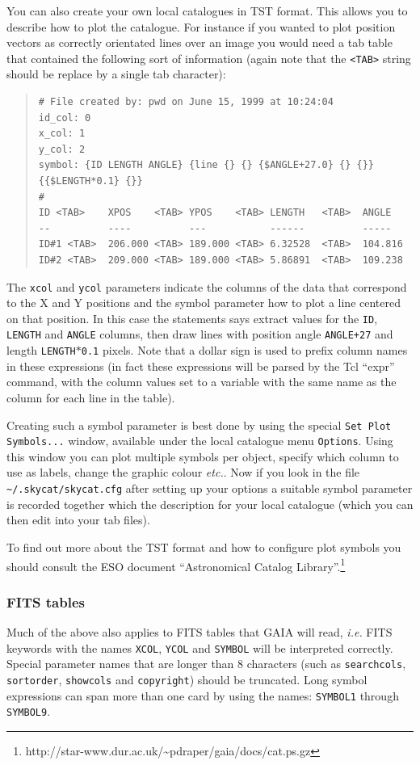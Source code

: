 \documentclass[twoside,11pt]{article}
\newcommand{\htmladdnormallinkfoot}[2]{#1\footnote{#2}}
\renewcommand{\_}{\texttt{\symbol{95}}}
\newcommand{\mytt}[1]{{\texttt{#1}}}
\begin{document}
You can also create your own local catalogues in TST format. This
allows you to describe how to plot the catalogue. For instance if you
wanted to plot position vectors as correctly orientated lines over an
image you would need a tab table that contained the following sort of
information (again note that the \mytt{<TAB>} string should be replace
by a single tab character):
\begin{quote}
\begin{verbatim}
# File created by: pwd on June 15, 1999 at 10:24:04
id_col: 0
x_col: 1
y_col: 2
symbol: {ID LENGTH ANGLE} {line {} {} {$ANGLE+27.0} {} {}} {{$LENGTH*0.1} {}}
#
ID <TAB>    XPOS    <TAB> YPOS    <TAB> LENGTH   <TAB>  ANGLE
--          ----          ---           ------          -----
ID#1 <TAB>  206.000 <TAB> 189.000 <TAB> 6.32528  <TAB>  104.816
ID#2 <TAB>  209.000 <TAB> 189.000 <TAB> 5.86891  <TAB>  109.238
\end{verbatim}
\end{quote}
The \mytt{x\_col} and \mytt{y\_col} parameters indicate the columns of
the data that correspond to the X and Y positions and the symbol
parameter how to plot a line centered on that position. In this case
the statements says extract values for the \mytt{ID}, \mytt{LENGTH}
and \mytt{ANGLE} columns, then draw lines with position angle
\mytt{ANGLE+27} and length \mytt{LENGTH$*$0.1} pixels. Note that a
dollar sign is used to prefix column names in these expressions (in
fact these expressions will be parsed by the Tcl ``expr'' command,
with the column values set to a variable with the same name as the
column for each line in the table).

Creating such a symbol parameter is best done by using the special
\mytt{Set Plot Symbols...} window, available under the local catalogue
menu \mytt{Options}. Using this window you can plot multiple symbols per
object, specify which column to use as labels, change the graphic
colour {\em etc.}. Now if you look in the file
\mytt{\~{}/.skycat/skycat.cfg} after setting up your options a suitable
symbol parameter is recorded together which the description for your
local catalogue (which you can then edit into your tab files).

To find out more about the TST format and how to configure plot
symbols you should consult the ESO document
\htmladdnormallinkfoot{``Astronomical Catalog Library''.}
{http://star-www.dur.ac.uk/\~{}pdraper/gaia/docs/cat.ps.gz}

\subsubsection{FITS tables} Much of the above also applies to FITS tables
that GAIA will read, \textit{i.e.} FITS keywords with the names
\mytt{X\_COL}, \mytt{Y\_COL} and \mytt{SYMBOL} will be interpreted
correctly. Special parameter names that are longer than 8 characters
(such as \mytt{search\_cols}, \mytt{sort\_order}, \mytt{show\_cols}
and \mytt{copyright}) should be truncated. Long symbol expressions can
span more than one card by using the names: \mytt{SYMBOL1} through
\mytt{SYMBOL9}.
\end{document}
